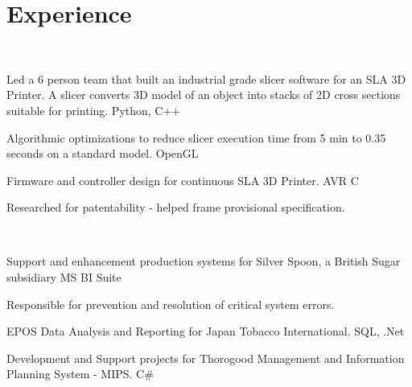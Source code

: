 \documentclass[]{deedy-resume-openfont}
\begin{document}
\begin{minipage}[t]{0.66\textwidth} 



\section{Experience}

\sectionsep

\\
\vspace{13pt}
\begin{tightemize}
\item  Led a 6 person team that built an industrial grade slicer software for an SLA 3D Printer. A slicer converts 3D model of an object into stacks of 2D cross sections suitable for printing. \hfill {
\selectfont 
Python, C++
} 
\item Algorithmic optimizations to reduce slicer execution time from 5 min to 0.35 seconds on a standard model. \hfill {
\selectfont 
OpenGL
}
\item Firmware and controller design for continuous SLA 3D Printer.\hfill {
\selectfont 
AVR C
}
\item Researched for patentability - helped frame provisional specification.
\end{tightemize}

\sectionsep{}

\\
\vspace{\topsep} %
\begin{tightemize}
\item Support and enhancement production systems for Silver Spoon, a British Sugar subsidiary \hfill {
\selectfont MS BI Suite}
	\item Responsible for prevention and resolution of critical system errors.  
	\item EPOS Data Analysis and Reporting for Japan Tobacco International. \hfill{
\selectfont SQL, .Net}
	\item Development and Support projects for Thorogood Management and Information Planning System - MIPS. \hfill{ \selectfont C\#}
\end{tightemize}
\sectionsep


\end{minipage}
\end{document}
